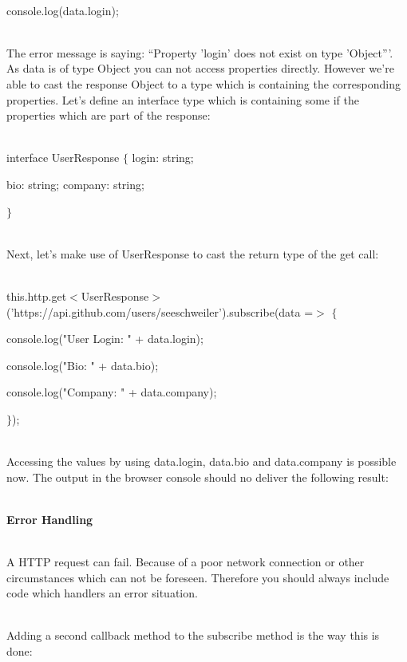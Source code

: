 \documentclass{article}
\begin{document}
\noindent \\ console.log(data.login);

\noindent 

\noindent \\ The error message is saying: ``Property 'login' does not exist on type 'Object'''. As data is of type Object you can not access properties directly. However we're able to cast the response Object to a type which is containing the corresponding properties. Let's define an interface type which is containing some if the properties which are part of the response:

\noindent \\ interface UserResponse $\mathrm{\{}$ login: string;

\noindent bio: string; company: string;

\noindent $\mathrm{\}}$

\noindent \\ Next, let's make use of UserResponse to cast the return type of the get call: 

\noindent  \\ this.http.get$\mathrm{<}$UserResponse$\mathrm{>}$('https://api.github.com/users/seeschweiler').subscribe(data =$\mathrm{>}$ $\mathrm{\{}$

\noindent console.log("User Login: " + data.login); 

\noindent console.log("Bio: " + data.bio); 

\noindent console.log("Company: " + data.company);

\noindent $\mathrm{\}}$);

\noindent \\ Accessing the values by using data.login, data.bio and data.company is possible now. The output in the browser console should no deliver the following result:

\noindent 

\noindent \\ \textbf{Error Handling}

\noindent 

\noindent \\ A HTTP request can fail. Because of a poor network connection or other circumstances which can not be foreseen. Therefore you should always include code which handlers an error situation.

\noindent \\ Adding a second callback method to the subscribe method is the way this is done:

\noindent 
\end{document}
